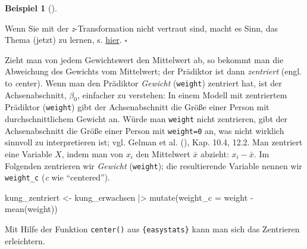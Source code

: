 \documentclass[
  ngerman,
  letterpaper,
  twoside,
  open=any]{scrbook}
\newenvironment{Shaded}{\begin{snugshade}}{\end{snugshade}}
\newcommand{\AttributeTok}[1]{\textcolor[rgb]{0.40,0.45,0.13}{#1}}
\newcommand{\FunctionTok}[1]{\textcolor[rgb]{0.28,0.35,0.67}{#1}}
\newcommand{\NormalTok}[1]{\textcolor[rgb]{0.00,0.23,0.31}{#1}}
\newcommand{\OtherTok}[1]{\textcolor[rgb]{0.00,0.23,0.31}{#1}}
\newcommand{\SpecialCharTok}[1]{\textcolor[rgb]{0.37,0.37,0.37}{#1}}
\theoremstyle{definition}
\newtheorem{example}{Beispiel}[chapter]
\theoremstyle{plain}
\theoremstyle{definition}
\theoremstyle{definition}
\theoremstyle{remark}
\begin{document}
\begin{example}[]
\begin{tcolorbox}[enhanced jigsaw, arc=.35mm, bottomrule=.15mm, bottomtitle=1mm, breakable, colback=white, colbacktitle=quarto-callout-note-color!10!white, colframe=quarto-callout-note-color-frame, coltitle=black, left=2mm, leftrule=.75mm, opacityback=0, opacitybacktitle=0.6, rightrule=.15mm, title=\textcolor{quarto-callout-note-color}{\faInfo}\hspace{0.5em}{Hinweis}, titlerule=0mm, toprule=.15mm, toptitle=1mm]

Wenn Sie mit der \emph{z}-Transformation nicht vertraut sind, macht es
Sinn, das Thema (jetzt) zu lernen, s.
\href{https://statistik1.netlify.app/060-modellguete.html\#die-z-transformation}{hier}.\footnotemark{}
\(\square\)

\end{tcolorbox}


Zieht man von jedem Gewichtswert den Mittelwert ab, so bekommt man die
Abweichung des Gewichts vom Mittelwert; der Prädiktor ist dann
\emph{zentriert} (engl. to \emph{c}enter). Wenn man den Prädiktor
\emph{Gewicht} (\texttt{weight}) zentriert hat, ist der Achsenabschnitt,
\(\beta_0\), einfacher zu verstehen: In einem Modell mit zentriertem
Prädiktor (\texttt{weight}) gibt der Achsenabschnitt die Größe einer
Person mit durchschnittlichem Gewicht an. Würde man \texttt{weight}
nicht zentrieren, gibt der Achsenabschnitt die Größe einer Person mit
\texttt{weight=0} an, was nicht wirklich sinnvoll zu interpretieren ist;
vgl. Gelman et al. (), Kap. 10.4, 12.2.
Man zentriert eine Variable \(X\), indem man von \(x_i\) den Mittelwert
\(\bar{x}\) abzieht: \(x_i - \bar{x}\). Im Folgenden zentrieren wir
\emph{Gewicht} (\texttt{weight}); die resultierende Variable nennen wir
\texttt{weight\_c} (\emph{c} wie \enquote{centered}).

\begin{Shaded}
\begin{Highlighting}[]
\NormalTok{kung\_zentriert }\OtherTok{\textless{}{-}}
\NormalTok{  kung\_erwachsen }\SpecialCharTok{|\textgreater{}} 
  \FunctionTok{mutate}\NormalTok{(}\AttributeTok{weight\_c =}\NormalTok{ weight }\SpecialCharTok{{-}} \FunctionTok{mean}\NormalTok{(weight))}
\end{Highlighting}
\end{Shaded}

Mit Hilfe der Funktion \texttt{center()} aus \texttt{\{easystats\}} kann
man sich das Zentrieren erleichtern.


\end{example}
\end{document}
